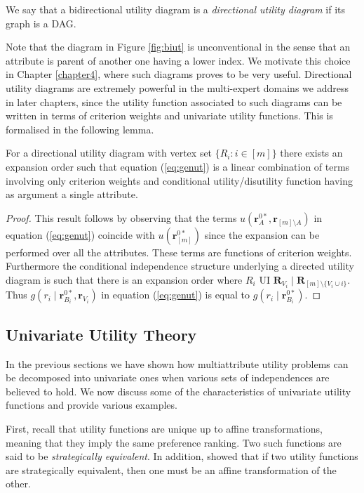 \begin{definition}
\label{def:dirutdia}
We say that a bidirectional utility diagram is a \emph{directional utility diagram} if its graph is a DAG.
\end{definition}
Note that the diagram in Figure \ref{fig:biut} is unconventional in the sense that an attribute is parent of another one having a lower index. We  motivate this choice in Chapter \ref{chapter4}, where such diagrams proves to be very useful. Directional utility diagrams are extremely powerful in the multi-expert domains we address in later chapters, since the utility function associated to such diagrams can be written in terms of criterion weights and univariate utility functions. This is formalised in the following lemma.
\begin{lemma}
\label{lemma:ut}
For a directional utility diagram with vertex set $\{R_i:i\in[m]\}$ there exists an expansion order such that equation  (\ref{eq:genut}) is a linear combination of terms involving only criterion weights and conditional utility/disutility function having as argument a single attribute. 
\end{lemma}
\begin{proof}
This result follows by observing that the terms $u(\bm{r}_A^{0*},\bm{r}_{[m]\setminus A})$ in equation (\ref{eq:genut}) coincide with $u(\bm{r}_{[m]}^{0*})$ since the expansion can be performed over all the attributes. These terms are functions of criterion weights. Furthermore the conditional independence structure underlying a directed utility diagram is such that there is an expansion order where $R_i$ UI $\bm{R}_{V_i}\;|\; \bm{R}_{[m]\setminus \{V_i\cup i\}}$. Thus $g(r_i\;|\; \bm{r}_{B_i}^{0*},\bm{r}_{V_i})$ in equation (\ref{eq:genut}) is equal to $g(r_i\;|\; \bm{r}_{B_i}^{0*})$.
\end{proof}

\subsection{Univariate Utility Theory}
\label{sec:univariate}
In the previous sections we have shown how multiattribute utility problems can be decomposed into univariate ones when various sets of independences are believed to hold. We now discuss some of the characteristics of univariate utility functions and provide various examples. 

First, recall that utility functions are unique up to affine transformations, meaning that they imply the same preference ranking. Two such functions are said to be \textit{strategically equivalent}. In addition, \citet{Keeney1993a} showed that if two utility functions are strategically equivalent, then one must be an affine transformation of the other. 

